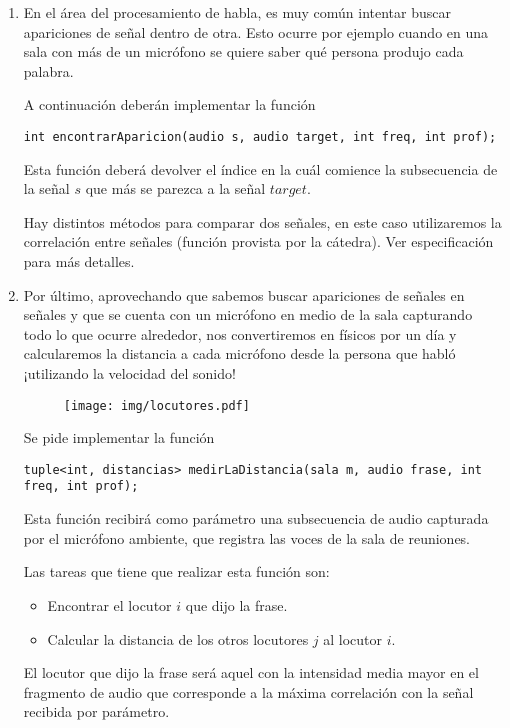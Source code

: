 \documentclass[a4paper]{article}
\begin{document}
\begin{enumerate}
\item En el área del procesamiento de habla, es muy común intentar buscar apariciones de señal dentro de otra. Esto ocurre por ejemplo cuando en una sala con más de un micrófono se quiere saber qué persona produjo cada palabra.

A continuación deberán implementar la función \begin{lstlisting}
int encontrarAparicion(audio s, audio target, int freq,	int prof);
\end{lstlisting}

Esta función deberá devolver el índice en la cuál comience la subsecuencia de la señal $s$ que más se parezca a la señal $target$.

Hay distintos métodos para comparar dos señales, en este caso utilizaremos la correlación entre señales (función provista por la cátedra). Ver especificación para más detalles.



\item Por último, aprovechando que sabemos buscar apariciones de señales en señales y que se cuenta con un micrófono en medio de la sala capturando todo lo que ocurre alrededor, nos convertiremos en físicos por un día y calcularemos la distancia a cada micrófono desde la persona que habló ¡utilizando la velocidad del sonido!

\begin{figure}[h]
\begin{center}
\texttt{[image: img/locutores.pdf]}
\end{center}
\end{figure}

Se pide implementar la función
\begin{lstlisting}
tuple<int, distancias> medirLaDistancia(sala m, audio frase, int freq, int prof);
\end{lstlisting}
Esta función recibirá como parámetro una subsecuencia de audio capturada por el micrófono ambiente, que registra las voces de la sala de reuniones.

Las tareas que tiene que realizar esta función son:
\begin{itemize}
\item Encontrar el locutor $i$ que dijo la frase.
\item Calcular la distancia de los otros locutores $j$ al locutor $i$.
\end{itemize}




El locutor que dijo la frase será aquel con la intensidad media mayor en el fragmento de audio que corresponde a la máxima correlación con la señal recibida por parámetro.


\end{enumerate}
\end{document}
